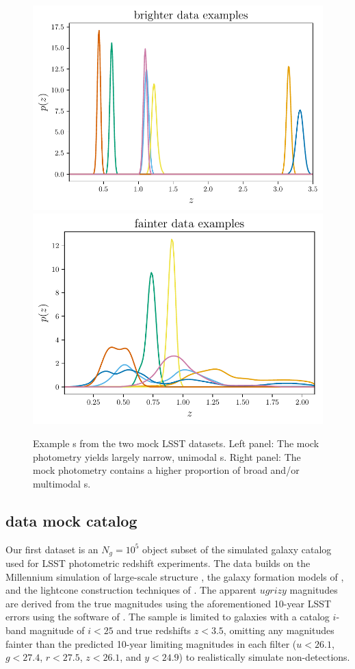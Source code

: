\begin{figure}
	\begin{center}
		\includegraphics[width=0.49\columnwidth]{figures/qp/graham_pzs.pdf}
		\includegraphics[width=0.49\columnwidth]{figures/qp/schmidt_pzs.pdf}
		\caption{
			Example \pz s from the two mock LSST datasets.
			Left panel: The \mgdata mock photometry yields largely narrow, unimodal \pz s.
			Right panel: The \ssdata mock photometry contains a higher proportion of broad 
			and/or multimodal \pz s.
			}
	\end{center}
\end{figure}

\subsection{\Mgdata data mock catalog}

Our first dataset is an $N_{g} = 10^{5}$ object subset of the 
\citet{graham_photometric_2017} simulated galaxy catalog used for LSST 
photometric redshift experiments.
The data builds on the Millennium simulation of large-scale structure 
\citep{springel_simulations_2005}, the galaxy formation models of 
\citet{gonzalez-perez_how_2014}, and the lightcone construction techniques of 
\citet{merson_lightcone_2013}.
The apparent $ugrizy$ magnitudes are derived from the true magnitudes using the 
aforementioned 10-year LSST errors using the software of 
\citet{connolly_end--end_2014}.
The sample is limited to galaxies with a catalog $i$-band magnitude of $i<25$ 
and true redshifts $z<3.5$, omitting any magnitudes fainter than the predicted 
10-year limiting magnitudes in each filter ($u<26.1$, $g<27.4$, $r<27.5$, 
$z<26.1$, and $y<24.9$) to realistically simulate non-detections.


